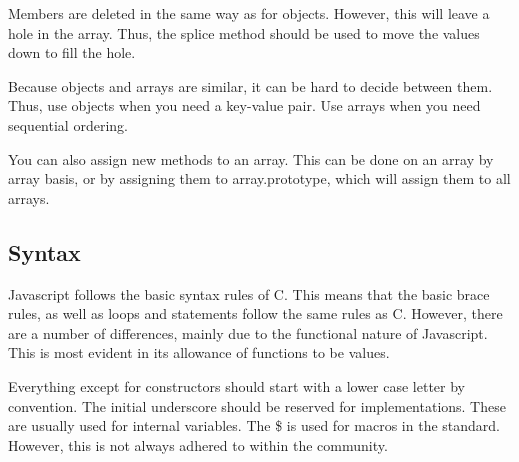 			Members are deleted in the same way as for objects. 
			However, this will leave a hole in the array. 
			Thus, the splice method should be used to move the values down to fill the hole. 

			Because objects and arrays are similar, it can be hard to decide between them. 
			Thus, use objects when you need a key-value pair. 
			Use arrays when you need sequential ordering. 

			You can also assign new methods to an array. 
			This can be done on an array by array basis, or by assigning them to array.prototype, 
			which will assign them to all arrays. 
		\subsection{Syntax}
			Javascript follows the basic syntax rules of C. 
			This means that the basic brace rules, as well as loops and statements follow the same rules as C. 
			However, there are a number of differences, mainly due to the functional nature of Javascript. 
			This is most evident in its allowance of functions to be values. 

			Everything except for constructors should start with a lower case letter by convention. 
			The initial underscore should be reserved for implementations. 
			These are usually used for internal variables. 
			The \$ is used for macros in the standard. 
			However, this is not always adhered to within the community. 

